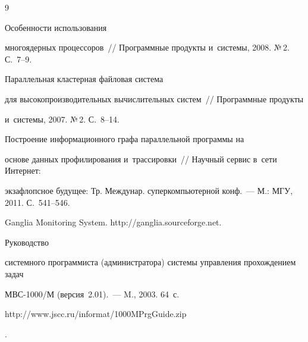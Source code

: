{\small\frenchspacing


{%




\begin{thebibliography}{9}










       Особенности использования


многоядерных процессоров~/\!\!/ Программные продукты и~системы, 2008. №\,2. С.~7--9.




       Параллельная кластерная файловая сис\-те\-ма


для высокопроизводительных вычислительных сис\-тем~/\!\!/ Программные продукты


и~сис\-те\-мы, 2007. №\,2. С.~8--14.




       Построение информационного графа параллельной программы на


основе данных профилирования и~трассировки~/\!\!/ Научный сервис в~сети Интернет:


экзафлопсное будущее: Тр. Междунар. суперкомпьютерной конф.~--- М.: МГУ, 2011. С.~541--546.




      Ganglia Monitoring System. {\sf http://ganglia.sourceforge.net}.




       Руководство


сис\-тем\-но\-го программиста (администратора) сис\-те\-мы управ\-ле\-ния прохождением задач


      МВС-1000/М (версия~2.01).~--- M., 2003.  64~с. {\sf


http://www.jscc.ru/informat/\linebreak 1000MPrgGuide.zip}.


\end{thebibliography}


} }








